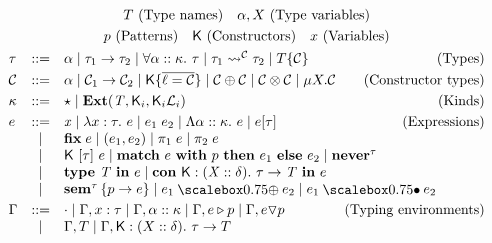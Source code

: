 \begin{gather*}
  T~\text{(Type names)}\quad \alpha,X~\text{(Type variables)} \\
  p~\text{(Patterns)}\quad \fnlab{K}~\text{(Constructors)} \quad x~\text{(Variables)} \\
  \begin{array}{lcl}
    \tau &::=& \tyvar{\alpha} \mid \tyarr{\tau_1}{\tau_2} \mid \tyall{\alpha}{\kappa}{\tau} \mid \tysem{\tau_1}{\con}{\tau_2} \mid \tydata{T}{\con} \qquad\hfill\text{(Types)}\\[1mm]
    \con &::=& \alpha \mid \con_1 \to \con_2 \mid \fnlab{K}\{\overline{\ell = \con}\} \mid \con \oplus \con \mid \con \otimes \con \mid \mu X. \con  \qquad\hfill\text{(Constructor types)}\\[1mm]
    \kappa &::=& \kitype{} \mid \fnkey{Ext}(\tname, \fnlab{K}_i, \fnlab{K}_i\mathcal{L}_i) \qquad\hfill\text{(Kinds)}\\[1mm]
    e &::=& \tmvar{x} \mid \tmlam{x}{\tau}{e} \mid \tmapp{e_1}{e_2} \mid \tmtylam{\alpha}{\kappa}{e} \mid \tmtyapp{e}{\tau} \qquad\hfill\text{(Expressions)}\\
         & \mid & \tmfix{e} \mid \tmprod{e_1}{e_2} \mid \tmproj{1}{e} \mid \tmproj{2}{e} \\
         & \mid & \tmconapp{K}{\tau}{e} \mid \tmmatch{e}{p}{e_1}{e_2} \mid \tmnever{\tau} \\
         & \mid & \tmtype{T}{e} \mid \tmcondef{K}{X}{\delta}{\tau}{T}{e} \\
         & \mid & \tmsem{\tau}{p}{e} \mid \tmcomp{e_1}{e_2} \mid \tmsemapp{e_1}{e_2}\\[1mm]
    \Gamma &::=& \cdot \mid \Gamma, x : \tau \mid \Gamma, \alpha :: \kappa \mid \Gamma, \envmatch{e}{p} \mid \Gamma, \envnomatch{e}{p} \qquad\hfill\text{(Typing environments)}\\
         &\mid& \Gamma, T \mid \Gamma, \fnlab{K} : (X :: \delta).~\tau \to T
  \end{array}
\end{gather*}
